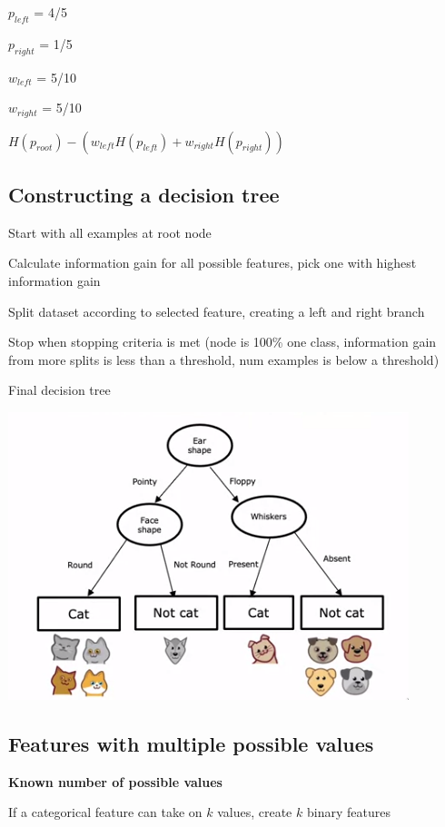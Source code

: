 \documentclass[12pt]{article}
\begin{document}
$p_{left}$ = 4/5

$p_{right}$ = 1/5

$w_{left}$ = 5/10

$w_{right}$ = 5/10

$H(p_{root}) - (w_{left} H(p_{left}) + w_{right} H(p_{right}))$

\subsection{Constructing a decision tree}

\begin{myenumerate}
    \item Start with all examples at root node
    \item Calculate information gain for all possible features, pick one with highest information gain
    \item Split dataset according to selected feature, creating a left and right branch
    \item Stop when stopping criteria is met (node is 100\% one class, information gain
        from more splits is less than a threshold, num examples is below a threshold)
\end{myenumerate}

Final decision tree

\includegraphics[scale=.5]{decision-tree}

\subsection{Features with multiple possible values}

\textbf{Known number of possible values}

If a categorical feature can take on $k$ values, create $k$ binary features
\end{document}
